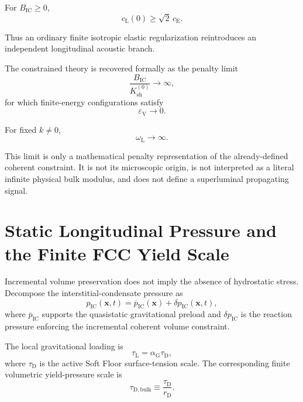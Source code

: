 For $B_{\mathrm{IC}}\geq0$,
\begin{equation}
    c_{\mathrm{L}}(0)
    \geq
    \sqrt{2}\,
    c_{\mathrm{E}}.
\end{equation}

Thus an ordinary finite isotropic elastic regularization reintroduces an independent longitudinal acoustic branch.

The constrained theory is recovered formally as the penalty limit
\begin{equation}
    \frac{
        B_{\mathrm{IC}}
    }{
        K_{\mathrm{sh}}^{(0)}
    }
    \rightarrow
    \infty,
\end{equation}
for which finite-energy configurations satisfy
\begin{equation}
    \varepsilon_{\mathrm{V}}
    \rightarrow
    0.
\end{equation}

For fixed $k\neq0$,
\begin{equation}
    \omega_{\mathrm{L}}
    \rightarrow
    \infty.
\end{equation}

This limit is only a mathematical penalty representation of the already-defined coherent constraint. It is not its microscopic origin, is not interpreted as a literal infinite physical bulk modulus, and does not define a superluminal propagating signal.


\section{Static Longitudinal Pressure and the Finite FCC Yield Scale}
\label{sec:AP_static_pressure_yield}

Incremental volume preservation does not imply the absence of hydrostatic stress. Decompose the interstitial-condensate pressure as
\begin{equation}
    p_{\mathrm{IC}}(\mathbf{x},t)
    =
    \overline{p}_{\mathrm{IC}}(\mathbf{x})
    +
    \delta p_{\mathrm{IC}}(\mathbf{x},t),
\end{equation}
where $\overline{p}_{\mathrm{IC}}$ supports the quasistatic gravitational preload and $\delta p_{\mathrm{IC}}$ is the reaction pressure enforcing the incremental coherent volume constraint.

The local gravitational loading is
\begin{equation}
    \tau_{\mathrm{L}}
    =
    \alpha_{\mathrm{G}}\tau_{\mathrm{D}},
\end{equation}
where $\tau_{\mathrm{D}}$ is the active Soft Floor surface-tension scale. The corresponding finite volumetric yield-pressure scale is
\begin{equation}
    \tau_{\mathrm{D,bulk}}
    \equiv
    \frac{\tau_{\mathrm{D}}}{r_{\mathrm{D}}}.
\end{equation}

